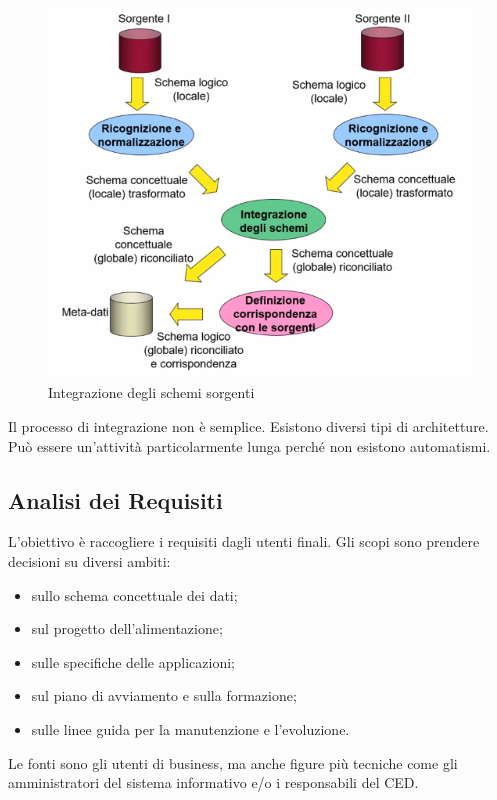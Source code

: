 \begin{figure}[H]
	\begin{center}
		\includegraphics[width=0.5\linewidth]{img/integration.PNG}
		\caption{Integrazione degli schemi sorgenti}
	\end{center}
\end{figure}

Il processo di integrazione non è semplice. Esistono diversi tipi di architetture. Può essere un'attività particolarmente lunga perché non esistono automatismi.


\subsection{Analisi dei Requisiti}
L'obiettivo è raccogliere i requisiti dagli utenti finali. Gli scopi sono prendere decisioni su diversi ambiti:
\begin{itemize}
	\item sullo schema concettuale dei dati;
	\item sul progetto dell'alimentazione;
	\item sulle specifiche delle applicazioni;
	\item sul piano di avviamento e sulla formazione;
	\item sulle linee guida per la manutenzione e l'evoluzione.
\end{itemize}
Le fonti sono gli utenti di business, ma anche figure più tecniche come gli amministratori del sistema informativo e/o i responsabili del CED.

